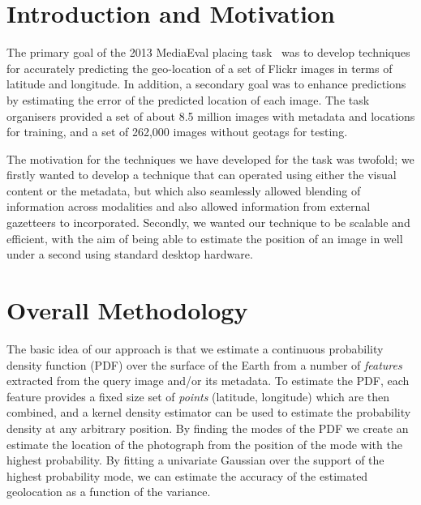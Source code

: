 \documentclass{../acm_proc_article-me11_tweaked}
\begin{document}

\section{Introduction and Motivation}
The primary goal of the 2013 MediaEval placing task~\cite{mediaevalPlacing13} was to develop techniques for accurately predicting the geo-location of a set of Flickr images in terms of latitude and longitude. In addition, a secondary goal was to enhance predictions by estimating the error of the predicted location of each image. The task organisers provided a set of about 8.5 million images with metadata and locations for training, and a set of 262,000 images without geotags for testing.

The motivation for the techniques we have developed for the task was twofold; we firstly wanted to develop a technique that can operated using either the visual content or the metadata, but which also seamlessly allowed blending of information across modalities and also allowed information from external gazetteers to incorporated. Secondly, we wanted our technique to be scalable and efficient, with the aim of being able to estimate the position of an image in well under a second using standard desktop hardware.

\section{Overall Methodology}\label{sec:meth}
The basic idea of our approach is that we estimate a continuous probability density function (PDF) over the surface of the Earth from a number of \emph{features} extracted from the query image and/or its metadata. To estimate the PDF, each feature provides a fixed size set of \emph{points} (latitude, longitude) which are then combined, and a kernel density estimator can be used to estimate the probability density at any arbitrary position. By finding the modes of the PDF we create an estimate the location of the photograph from the position of the mode with the highest probability. By fitting a univariate Gaussian over the support of the highest probability mode, we can estimate the accuracy of the estimated geolocation as a function of the variance.

\end{document}
